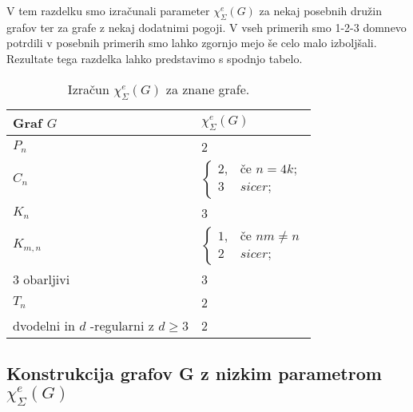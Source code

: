 \documentclass[12pt,a4paper,twoside]{article}
\theoremstyle{definition} %
\theoremstyle{plain} %
\newcommand{\ec}{\chi_{\Sigma}^e}
\numberwithin{equation}{section}  %
\begin{document}
 


V tem razdelku smo izračunali parameter $\ec(G)$ za nekaj posebnih družin grafov ter za grafe z nekaj dodatnimi pogoji. V vseh primerih smo 1-2-3 domnevo potrdili v posebnih primerih smo lahko zgornjo mejo še celo malo izboljšali. Rezultate tega razdelka lahko predstavimo s spodnjo tabelo.
\begin{table}[H]

\caption{\label{tab:tab1} Izračun $\ec(G)$ za znane grafe. }
\centering
\begin{tabular}{|l|l|}
\hline
 Graf $G$ & $\ec(G)$  \\ \hline
 $P_n$ & 2  \\ \hline
 $C_n$ & $\begin{cases}
	2 ,& \text{če } n = 4k;\\ 
	3 & sicer;
	\end{cases}$  \\ \hline
 $K_n$& 3  \\ \hline
 $K_{m,n}$& $\begin{cases}
	1 ,& \text{če } nm \neq n\\ 
	2 & sicer;
	\end{cases}$  \\ \hline
 3 obarljivi& 3  \\ \hline
$T_n$ & 2  \\ \hline
dvodelni in $d$ -regularni z $d \ge 3 $ & 2  \\ \hline
\end{tabular}
\end{table}

\subsection{Konstrukcija grafov G z nizkim parametrom $\ec(G)$}
\end{document}
